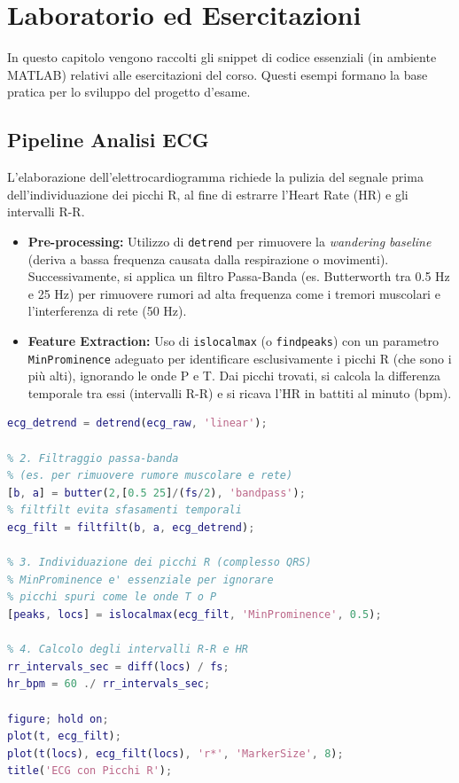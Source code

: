 \chapter{Laboratorio ed Esercitazioni}

In questo capitolo vengono raccolti gli snippet di codice essenziali (in ambiente MATLAB) relativi alle esercitazioni del corso. Questi esempi formano la base pratica per lo sviluppo del progetto d'esame.

\section{Pipeline Analisi ECG}
L'elaborazione dell'elettrocardiogramma richiede la pulizia del segnale prima dell'individuazione dei picchi R, al fine di estrarre l'Heart Rate (HR) e gli intervalli R-R.

\begin{itemize}
    \item \textbf{Pre-processing:} Utilizzo di \texttt{detrend} per rimuovere la \textit{wandering baseline} (deriva a bassa frequenza causata dalla respirazione o movimenti). Successivamente, si applica un filtro Passa-Banda (es. Butterworth tra 0.5 Hz e 25 Hz) per rimuovere rumori ad alta frequenza come i tremori muscolari e l'interferenza di rete (50 Hz).
    \item \textbf{Feature Extraction:} Uso di \texttt{islocalmax} (o \texttt{findpeaks}) con un parametro \texttt{MinProminence} adeguato per identificare esclusivamente i picchi R (che sono i più alti), ignorando le onde P e T. Dai picchi trovati, si calcola la differenza temporale tra essi (intervalli R-R) e si ricava l'HR in battiti al minuto (bpm).
\end{itemize}

\begin{lstlisting}[language=Matlab, frame=single, commentstyle=\color{green!50!black}, keywordstyle=\color{blue}, stringstyle=\color{purple}]
% 1. Rimozione della deriva di linea di base
ecg_detrend = detrend(ecg_raw, 'linear');

% 2. Filtraggio passa-banda
% (es. per rimuovere rumore muscolare e rete)
[b, a] = butter(2,[0.5 25]/(fs/2), 'bandpass');
% filtfilt evita sfasamenti temporali
ecg_filt = filtfilt(b, a, ecg_detrend);

% 3. Individuazione dei picchi R (complesso QRS)
% MinProminence e' essenziale per ignorare
% picchi spuri come le onde T o P
[peaks, locs] = islocalmax(ecg_filt, 'MinProminence', 0.5);

% 4. Calcolo degli intervalli R-R e HR
rr_intervals_sec = diff(locs) / fs;
hr_bpm = 60 ./ rr_intervals_sec;

figure; hold on;
plot(t, ecg_filt);
plot(t(locs), ecg_filt(locs), 'r*', 'MarkerSize', 8);
title('ECG con Picchi R');
\end{lstlisting}

